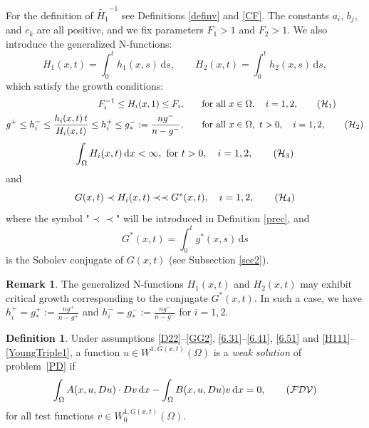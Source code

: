 \documentclass[10pt,reqno]{amsart}
\newcommand *\w{^\wedge}
\theoremstyle{definition}
\newtheorem{definition}[theorem]{Definition}
\newtheorem{remark}[theorem]{Remark}
\numberwithin{equation}{section}
\begin{document}
For the definition of $\widetilde{H_1}^{-1}$ see Definitions \ref{definv} and \ref{CF}. The constants \( a_i \), \( b_j \), and \( c_k \) are all positive, and we fix parameters \( F_1 > 1 \) and \( F_2 > 1 \). We also introduce the generalized \textnormal{N}-functions:
\[
H_1(x,t) = \int_0^t h_1(x,s)\, \mathrm{d}s,\qquad H_2(x,t) = \int_0^t h_2(x,s)\, \mathrm{d}s,
\]
which satisfy the growth conditions:
\begin{align}
F_i^{-1} \leq H_i(x,1) \leq F_i, &\qquad \text{for all } x \in \Omega,\quad i=1,2, \tag{$\mathcal{H}_1$} \label{H111}\\
g^+ \leq h_i^- \leq \frac{h_i(x,t)\, t}{H_i(x,t)} \leq h_i^+\leq g_*^-:=\frac{ng^-}{n-g^-}, &\qquad \text{for all } x \in \Omega,\ t > 0,\quad i=1,2, \tag{$\mathcal{H}_2$} \label{H211}
\end{align}
\begin{equation}
\int_{\Omega} H_i(x,t) \, \mathrm{d}x < \infty,\ \text{for } t>0,\quad i=1,2, \tag{$\mathcal{H}_3$}\label{YoungTriple4}
\end{equation}
and
\begin{equation}
G(x,t) \prec H_i(x,t) \prec\prec G^*(x,t),\quad i = 1,2, \tag{$\mathcal{H}_4$}\label{YoungTriple1}
\end{equation}
where the symbol "$\prec\prec$" will be introduced in Definition \ref{prec}, and
\[
G^*(x,t) = \int_0^t g^*(x,s)\, \mathrm{d}s
\]
is the Sobolev conjugate of \( G(x,t) \) (see Subsection \ref{sec2}).

\begin{remark}
The generalized \textnormal{N}-functions \( H_1(x,t) \) and \( H_2(x,t) \) may exhibit critical growth corresponding to the conjugate \( G^*(x,t) \). In such a case, we have \( h_i^+ = g_*^+ := \frac{n g^+}{n - g^+} \) and \( h_i^- = g_*^- := \frac{n g^-}{n - g^-} \) for \( i = 1,2 \).
\end{remark}

\begin{definition}\label{Definition 4.1}
Under assumptions \eqref{D22}--\eqref{GG2}, \eqref{6.31}--\eqref{6.41}, \eqref{6.51} and \eqref{H111}--\eqref{YoungTriple1}, a function \( u \in W^{1,G(x,t)}(\Omega) \) is a \emph{weak solution} of problem~\eqref{PD} if
\begin{equation}\label{4.9}
\int_{\Omega} A(x, u, Du) \cdot Dv \, \mathrm{d}x - \int_{\Omega} B(x, u, Du) v \, \mathrm{d}x = 0, \tag{$\mathcal{FDV}$}
\end{equation}
for all test functions \( v \in W_0^{1,G(x,t)}(\Omega) \).
\end{definition}
\end{document}
